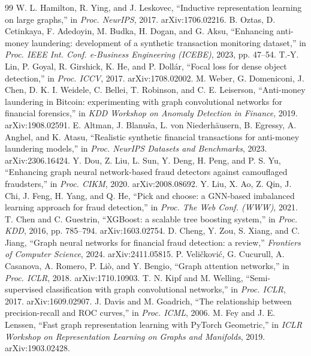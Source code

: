 \documentclass[conference]{IEEEtran}
\begin{document}
\begin{thebibliography}{99}
 W. L. Hamilton, R. Ying, and J. Leskovec, ``Inductive representation learning on large graphs,'' in \textit{Proc. NeurIPS}, 2017. arXiv:1706.02216.
 B. Oztas, D. Cetinkaya, F. Adedoyin, M. Budka, H. Dogan, and G. Aksu, ``Enhancing anti-money laundering: development of a synthetic transaction monitoring dataset,'' in \textit{Proc. IEEE Int. Conf. e-Business Engineering (ICEBE)}, 2023, pp. 47--54.
 T.-Y. Lin, P. Goyal, R. Girshick, K. He, and P. Doll\'ar, ``Focal loss for dense object detection,'' in \textit{Proc. ICCV}, 2017. arXiv:1708.02002.
 M. Weber, G. Domeniconi, J. Chen, D. K. I. Weidele, C. Bellei, T. Robinson, and C. E. Leiserson, ``Anti-money laundering in Bitcoin: experimenting with graph convolutional networks for financial forensics,'' in \textit{KDD Workshop on Anomaly Detection in Finance}, 2019. arXiv:1908.02591.
 E. Altman, J. Blanu\v{s}a, L. von Niederh\"ausern, B. Egressy, A. Anghel, and K. Atasu, ``Realistic synthetic financial transactions for anti-money laundering models,'' in \textit{Proc. NeurIPS Datasets and Benchmarks}, 2023. arXiv:2306.16424.
 Y. Dou, Z. Liu, L. Sun, Y. Deng, H. Peng, and P. S. Yu, ``Enhancing graph neural network-based fraud detectors against camouflaged fraudsters,'' in \textit{Proc. CIKM}, 2020. arXiv:2008.08692.
 Y. Liu, X. Ao, Z. Qin, J. Chi, J. Feng, H. Yang, and Q. He, ``Pick and choose: a GNN-based imbalanced learning approach for fraud detection,'' in \textit{Proc. The Web Conf. (WWW)}, 2021.
 T. Chen and C. Guestrin, ``XGBoost: a scalable tree boosting system,'' in \textit{Proc. KDD}, 2016, pp. 785--794. arXiv:1603.02754.
 D. Cheng, Y. Zou, S. Xiang, and C. Jiang, ``Graph neural networks for financial fraud detection: a review,'' \textit{Frontiers of Computer Science}, 2024. arXiv:2411.05815.
 P. Veli\v{c}kovi\'c, G. Cucurull, A. Casanova, A. Romero, P. Li\`o, and Y. Bengio, ``Graph attention networks,'' in \textit{Proc. ICLR}, 2018. arXiv:1710.10903.
 T. N. Kipf and M. Welling, ``Semi-supervised classification with graph convolutional networks,'' in \textit{Proc. ICLR}, 2017. arXiv:1609.02907.
 J. Davis and M. Goadrich, ``The relationship between precision-recall and ROC curves,'' in \textit{Proc. ICML}, 2006.
 M. Fey and J. E. Lenssen, ``Fast graph representation learning with PyTorch Geometric,'' in \textit{ICLR Workshop on Representation Learning on Graphs and Manifolds}, 2019. arXiv:1903.02428.

\end{thebibliography}
\end{document}
